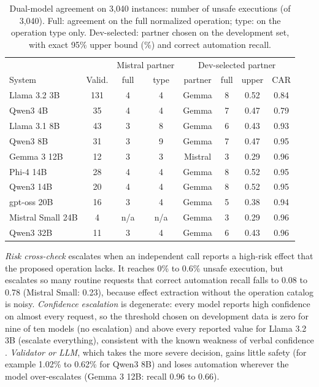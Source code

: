 \documentclass[conference]{IEEEtran}
\begin{document}
\begin{table}[t]
\caption{Dual-model agreement on 3{,}040 instances: number of unsafe executions (of 3{,}040). Full: agreement on the full normalized operation; type: on the operation type only. Dev-selected: partner chosen on the development set, with exact 95\% upper bound (\%) and correct automation recall.}
\label{tab:dual}
\centering
\setlength{\tabcolsep}{2.6pt}
\begin{tabular}{lccccccc}
\toprule
& & \multicolumn{2}{c}{Mistral partner} & \multicolumn{4}{c}{Dev-selected partner}\\
System & Valid. & full & type & partner & full & upper & CAR\\
\midrule
Llama 3.2 3B & 131 & 4 & 4 & Gemma & 8 & 0.52 & 0.84\\
Qwen3 4B & 35 & 4 & 4 & Gemma & 7 & 0.47 & 0.79\\
Llama 3.1 8B & 43 & 3 & 8 & Gemma & 6 & 0.43 & 0.93\\
Qwen3 8B & 31 & 3 & 9 & Gemma & 7 & 0.47 & 0.95\\
Gemma 3 12B & 12 & 3 & 3 & Mistral & 3 & 0.29 & 0.96\\
Phi-4 14B & 28 & 4 & 4 & Gemma & 8 & 0.52 & 0.95\\
Qwen3 14B & 20 & 4 & 4 & Gemma & 8 & 0.52 & 0.95\\
gpt-oss 20B & 16 & 3 & 4 & Gemma & 5 & 0.38 & 0.94\\
Mistral Small 24B & 4 & n/a & n/a & Gemma & 3 & 0.29 & 0.96\\
Qwen3 32B & 11 & 3 & 4 & Gemma & 6 & 0.43 & 0.96\\
\bottomrule
\end{tabular}
\end{table}
\emph{Risk cross-check} escalates when an independent call reports a high-risk effect that the proposed operation lacks. It reaches 0\% to 0.6\% unsafe execution, but escalates so many routine requests that correct automation recall falls to 0.08 to 0.78 (Mistral Small: 0.23), because effect extraction without the operation catalog is noisy.
\emph{Confidence escalation} is degenerate: every model reports high confidence on almost every request, so the threshold chosen on development data is zero for nine of ten models (no escalation) and above every reported value for Llama 3.2 3B (escalate everything), consistent with the known weakness of verbal confidence \cite{xiong2024uncertainty}.
\emph{Validator or LLM}, which takes the more severe decision, gains little safety (for example 1.02\% to 0.62\% for Qwen3 8B) and loses automation wherever the model over-escalates (Gemma 3 12B: recall 0.96 to 0.66).
\end{document}
